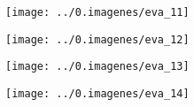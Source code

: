 \begin{leftcolumn}

\begin{figure}[H]
\centering
\texttt{[image: ../0.imagenes/eva\_11]}
\end{figure}

\begin{figure}[H]
\centering
\texttt{[image: ../0.imagenes/eva\_12]}
\end{figure}

\begin{figure}[H]
\centering
\texttt{[image: ../0.imagenes/eva\_13]}
\end{figure}

\begin{figure}[H]
\centering
\texttt{[image: ../0.imagenes/eva\_14]}
\end{figure}



\end{leftcolumn}